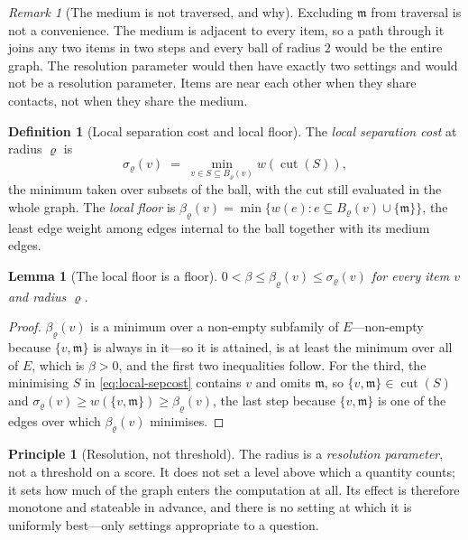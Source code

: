 \documentclass[11pt,twocolumn,a4paper]{article}
\theoremstyle{plain}
\newtheorem{lemma}[theorem]{Lemma}
\theoremstyle{definition}
\newtheorem{definition}[theorem]{Definition}
\newtheorem{principle}[theorem]{Principle}
\theoremstyle{remark}
\newtheorem{remark}[theorem]{Remark}
\newcommand{\med}{\mathfrak{m}}
\newcommand{\cut}{\operatorname{cut}}
\newcommand{\wt}{w}
\newcommand{\flo}{\beta}
\newcommand{\sepc}{\sigma}
\newcommand{\rad}{\varrho}
\begin{document}
\begin{remark}[The medium is not traversed, and why]
\label{rem:no-traverse}
Excluding $\med$ from traversal is not a convenience. The medium is adjacent to
every item, so a path through it joins any two items in two steps and every
ball of radius $2$ would be the entire graph. The resolution parameter would
then have exactly two settings and would not be a resolution parameter. Items
are near each other when they share contacts, not when they share the medium.
\end{remark}

\begin{definition}[Local separation cost and local floor]
\label{def:local}
The \emph{local separation cost} at radius $\rad$ is
\begin{equation}
\sepc_\rad(v)\;=\;\min_{v\in S\subseteq B_\rad(v)}\wt(\cut(S)),
\label{eq:local-sepcost}
\end{equation}
the minimum taken over subsets of the ball, with the cut still evaluated in the
whole graph. The \emph{local floor} is
$\flo_\rad(v)=\min\{\wt(e) : e\subseteq B_\rad(v)\cup\{\med\}\}$, the least
edge weight among edges internal to the ball together with its medium edges.
\end{definition}

\begin{lemma}[The local floor is a floor]
\label{lem:localfloor}
$0<\flo\le\flo_\rad(v)\le\sepc_\rad(v)$ for every item $v$ and radius $\rad$.
\end{lemma}

\begin{proof}
$\flo_\rad(v)$ is a minimum over a non-empty subfamily of $E$---non-empty
because $\{v,\med\}$ is always in it---so it is attained, is at least the
minimum over all of $E$, which is $\flo>0$, and the first two inequalities
follow. For the third, the minimising $S$ in \cref{eq:local-sepcost} contains
$v$ and omits $\med$, so $\{v,\med\}\in\cut(S)$ and
$\sepc_\rad(v)\ge\wt(\{v,\med\})\ge\flo_\rad(v)$, the last step because
$\{v,\med\}$ is one of the edges over which $\flo_\rad(v)$ minimises.
\end{proof}

\begin{principle}[Resolution, not threshold]
\label{prin:resolution}
The radius is a \emph{resolution parameter}, not a threshold on a score. It
does not set a level above which a quantity counts; it sets how much of the
graph enters the computation at all. Its effect is therefore monotone and
stateable in advance, and there is no setting at which it is uniformly
best---only settings appropriate to a question.
\end{principle}
\end{document}
